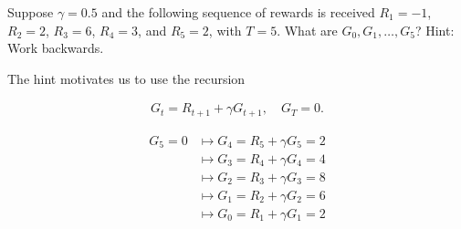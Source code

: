 
\begin{exercise}[Exercise 3.8]

Suppose $\gamma = 0.5$ and the following sequence of rewards is received $R_1 = -1$, $R_2 = 2$, $R_3 = 6$, $R_4 = 3$, and $R_5 = 2$, with $T = 5$.
What are $G_0, G_1 , \dots, G_5$?
Hint:
Work backwards.    

\end{exercise}


\begin{solution}

The hint motivates us to use the recursion \cite*[page 55]{SuttonRichardS2018Rl:a}

\begin{align} \label{eq:2.11}
	G_t = R_{t+1} + \gamma G_{t+1},
	\quad
	G_T = 0.
\end{align}

\begin{align*}
    G_5 = 0 & \mapsto G_4 = R_5 + \gamma G_5 = 2 \\
            & \mapsto G_3 = R_4 + \gamma G_4 = 4 \\
            & \mapsto G_2 = R_3 + \gamma G_3 = 8 \\
            & \mapsto G_1 = R_2 + \gamma G_2 = 6 \\
            & \mapsto G_0 = R_1 + \gamma G_1 = 2
\end{align*}

\end{solution}

